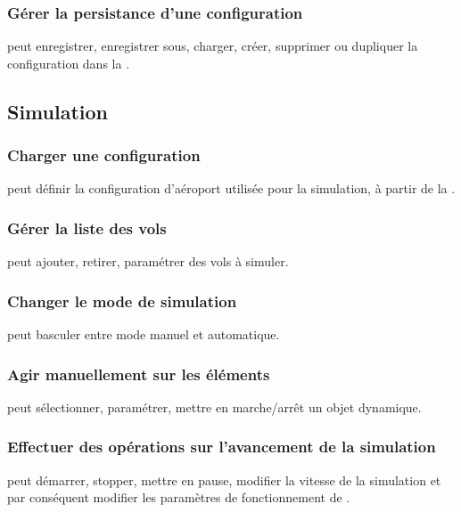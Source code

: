 \subsubsection{Gérer la persistance d'une configuration}
 peut enregistrer, enregistrer sous, charger, créer, supprimer ou dupliquer la configuration dans la .

\subsection{Simulation}
\subsubsection{Charger une configuration} 
 peut définir la configuration d'aéroport utilisée pour la simulation, à partir de la .

\subsubsection{Gérer la liste des vols}
 peut ajouter, retirer, paramétrer des vols à simuler.

\subsubsection{Changer le mode de simulation}
 peut basculer entre mode manuel et automatique.

\subsubsection{Agir manuellement sur les éléments}
 peut sélectionner, paramétrer, mettre en marche/arrêt un objet dynamique.

\subsubsection{Effectuer des opérations sur l'avancement de la simulation}
 peut démarrer, stopper, mettre en pause, modifier la vitesse de la simulation et par conséquent modifier les paramètres de fonctionnement de .

